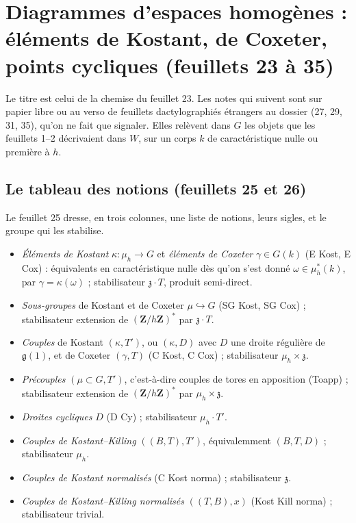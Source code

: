 \documentclass[11pt,a4paper]{article}
\begin{document}
\section*{Diagrammes d'espaces homogènes : éléments de Kostant, de Coxeter, points cycliques (feuillets 23 à 35)}

Le titre est celui de la chemise du feuillet 23. Les notes qui suivent sont sur
papier libre ou au verso de feuillets dactylographiés étrangers au dossier
(27, 29, 31, 35), qu'on ne fait que signaler. Elles relèvent dans $G$ les
objets que les feuillets 1--2 décrivaient dans $W$, sur un corps $k$ de
caractéristique nulle ou première à $h$.

\subsection*{Le tableau des notions (feuillets 25 et 26)}

Le feuillet 25 dresse, en trois colonnes, une liste de notions, leurs sigles,
et le groupe qui les stabilise.

\begin{itemize}
\item \emph{Éléments de Kostant} $\kappa\colon\mu_{h}\to G$ et \emph{éléments de
  Coxeter} $\gamma\in G(k)$ (E Kost, E Cox) : équivalents en caractéristique
  nulle dès qu'on s'est donné $\omega\in\mu_{h}^{*}(k)$, par $\gamma=\kappa(\omega)$ ;
  stabilisateur $\mathfrak{z}\cdot T$, produit semi-direct.
\item \emph{Sous-groupes} de Kostant et de Coxeter $\mu\hookrightarrow G$
  (SG Kost, SG Cox) ; stabilisateur extension de
  $(\mathbf{Z}/h\mathbf{Z})^{*}$ par $\mathfrak{z}\cdot T$.
\item \emph{Couples} de Kostant $(\kappa,T')$, ou $(\kappa,D)$ avec $D$ une
  droite régulière de $\mathfrak{g}(1)$, et de Coxeter $(\gamma,T)$
  (C Kost, C Cox) ; stabilisateur $\mu_{h}\times\mathfrak{z}$.
\item \emph{Précouples} $(\mu\subset G,T')$, c'est-à-dire couples de tores en
  apposition (Toapp) ; stabilisateur extension de
  $(\mathbf{Z}/h\mathbf{Z})^{*}$ par $\mu_{h}\times\mathfrak{z}$.
\item \emph{Droites cycliques} $D$ (D Cy) ; stabilisateur $\mu_{h}\cdot T'$.
\item \emph{Couples de Kostant--Killing} $((B,T),T')$, équivalemment
  $(B,T,D)$ ; stabilisateur $\mu_{h}$.
\item \emph{Couples de Kostant normalisés} (C Kost norma) ; stabilisateur
  $\mathfrak{z}$.
\item \emph{Couples de Kostant--Killing normalisés} $((T,B),x)$
  (Kost Kill norma) ; stabilisateur trivial.
\end{itemize}
\end{document}
